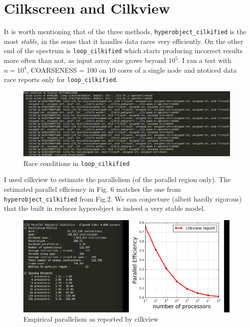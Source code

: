 \documentclass[12pt,letterpaper]{article}
\begin{document}
\section*{Cilkscreen and Cilkview}
\noindent It is worth mentioning that of the three methods, \texttt{hyperobject\_cilkified} is the most \textit{stable}, in the sense that it handles data races very efficiently. On the other end of the spectrum is \texttt{loop\_cilkified} which starts producing incorrect results more often than not, as input array size grows beyond $10^5$. I ran a test with $n = 10^4$, COARSENESS = 100 on 10 cores of a single node and ntoticed data race reports only for \texttt{loop\_cilkified}.
%
\newpage
\begin{figure}[h!]
\flushleft
\includegraphics[scale=0.45]{race_loop_cilkified.png}
\caption{Race conditions in \texttt{loop\_cilkified}}
\end{figure}
%
\noindent I used cilkview to estimate the parallelism (of the parallel region only). The estimated parallel efficiency in Fig. 6 matches the one from \texttt{hyperobject\_cilkified} from Fig.2. We can conjecture (albeit hardly rigorous) that the built in reducer hyperobject is indeed a very stable model.
\begin{figure}[h]
\flushleft
\includegraphics[scale=0.5]{ncores_scaling_cilkview.png}
\caption{Empirical parallelism as reported by cilkview}
\end{figure}
%
\end{document}
